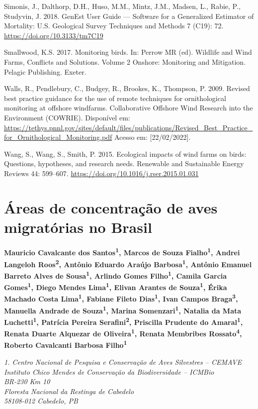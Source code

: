 \documentclass[
  oneside]{scrbook}
\begin{document}
Simonis, J., Dalthorp, D.H., Huso, M.M., Mintz, J.M., Madsen, L., Rabie, P., Studyvin, J. 2018. GenEst User Guide --- Software for a Generalized Estimator of Mortality: U.S. Geological Survey Techniques and Methods 7 (C19): 72. \url{https://doi.org/10.3133/tm7C19}

Smallwood, K.S. 2017. Monitoring birds. In: Perrow MR (ed). Wildlife and Wind Farms, Conflicts and Solutions. Volume 2 Onshore: Monitoring and Mitigation. Pelagic Publishing. Exeter.

Walls, R., Pendlebury, C., Budgey, R., Brookes, K., Thompson, P. 2009. Revised best practice guidance for the use of remote techniques for ornithological monitoring at offshore windfarms. Collaborative Offshore Wind Research into the Environment (COWRIE). Disponível em: \url{https://tethys.pnnl.gov/sites/default/files/publications/Revised_Best_Practice_for_Ornithological_Monitoring.pdf} Acesso em: {[}22/02/2022{]}.

Wang, S., Wang, S., Smith, P. 2015. Ecological impacts of wind farms on birds: Questions, hypotheses, and research needs. Renewable and Sustainable Energy Reviews 44: 599--607. \url{https://doi.org/10.1016/j.rser.2015.01.031}

\hypertarget{cap7}{%
\chapter{Áreas de concentração de aves migratórias no Brasil}\label{cap7}}

\pagestyle{headings}

\textbf{Mauricio Cavalcante dos Santos\textsuperscript{1}, Marcos de Souza Fialho\textsuperscript{1}, Andrei Langeloh Roos\textsuperscript{2}, Antônio Eduardo Araújo Barbosa\textsuperscript{1}, Antônio Emanuel Barreto Alves de Sousa\textsuperscript{1}, Arlindo Gomes Filho\textsuperscript{1}, Camila Garcia Gomes\textsuperscript{1}, Diego Mendes Lima\textsuperscript{1}, Elivan Arantes de Souza\textsuperscript{1}, Érika Machado Costa Lima\textsuperscript{1}, Fabiane Fileto Dias\textsuperscript{1}, Ivan Campos Braga\textsuperscript{3}, Manuella Andrade de Souza\textsuperscript{1}, Marina Somenzari\textsuperscript{1}, Natalia da Mata Luchetti\textsuperscript{1}, Patrícia Pereira Serafini\textsuperscript{2}, Priscilla Prudente do Amaral\textsuperscript{1}, Renata Duarte Alquezar de Oliveira\textsuperscript{1}, Renata Membribes Rossato\textsuperscript{4}, Roberto Cavalcanti Barbosa Filho\textsuperscript{1}}

\emph{1. Centro Nacional de Pesquisa e Conservação de Aves Silvestres -- CEMAVE}\\
\emph{Instituto Chico Mendes de Conservação da Biodiversidade -- ICMBio}\\
\emph{BR-230 Km 10}\\
\emph{Floresta Nacional da Restinga de Cabedelo}\\
\emph{58108-012 Cabedelo, PB}
\end{document}
